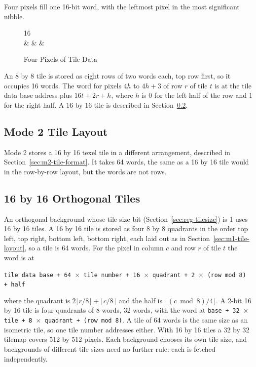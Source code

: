 Four pixels fill one 16-bit word, with the leftmost pixel in the most significant nibble.

\begin{figure}[H]
	\centering
	\begin{bytefield}[bitwidth=1.5em]{16}
		 \\
		 &
		 &
		 &
	\end{bytefield}
	\caption{Four Pixels of Tile Data}
	\label{fig:tile-word}
\end{figure}

An 8 by 8 tile is stored as eight rows of two words each, top row first, so it occupies 16 words. The word for pixels
$4h$ to $4h + 3$ of row $r$ of tile $t$ is at the tile data base address plus $16t + 2r + h$, where $h$ is 0 for the
left half of the row and 1 for the right half. A 16 by 16 tile is described in Section~\ref{sec:flat-16}.

\subsection{Mode 2 Tile Layout}

Mode 2 stores a 16 by 16 texel tile in a different arrangement, described in Section~\ref{sec:m2-tile-format}. It takes
64 words, the same as a 16 by 16 tile would in the row-by-row layout, but the words are not rows.

\subsection{16 by 16 Orthogonal Tiles}
\label{sec:flat-16}

An orthogonal background whose tile size bit (Section~\ref{sec:reg-tilesize}) is 1 uses 16 by 16 tiles. A 16 by 16 tile
is stored as four 8 by 8 quadrants in the order top left, top right, bottom left, bottom right, each laid out as in
Section~\ref{sec:m1-tile-layout}, so a tile is 64 words. For the pixel in column $c$ and row $r$ of tile $t$ the word
is at

\begin{center}
	\texttt{tile data base + 64 $\times$ tile number + 16 $\times$ quadrant + 2 $\times$ (row mod 8) + half}
\end{center}

where the quadrant is $2\lfloor r/8 \rfloor + \lfloor c/8 \rfloor$ and the half is $\lfloor (c \bmod 8)/4 \rfloor$. A
2-bit 16 by 16 tile is four quadrants of 8 words, 32 words, with the word at \texttt{base + 32 $\times$ tile + 8
	$\times$ quadrant + (row mod 8)}. A tile of 64 words is the same size as an isometric tile, so one tile number
addresses either. With 16 by 16 tiles a 32 by 32 tilemap covers 512 by 512 pixels. Each background chooses its own tile
size, and backgrounds of different tile sizes need no further rule: each is fetched independently.

